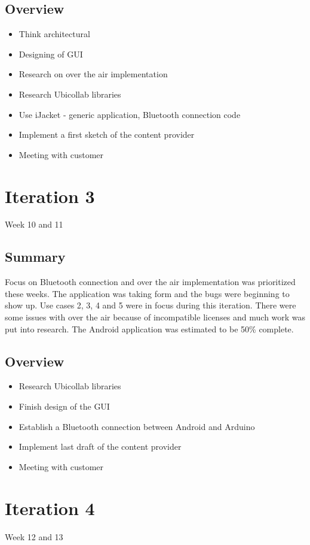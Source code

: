 \subsection{Overview}
\begin{itemize}
	\item{Think architectural}
	\item{Designing of GUI}
	\item{Research on over the air implementation}
	\item{Research Ubicollab libraries}
	\item{Use iJacket - generic application, Bluetooth connection code}
	\item{Implement a first sketch of the content provider}
	\item{Meeting with customer}
\end{itemize}

\section{Iteration 3}
Week 10 and 11
\subsection{Summary}
	Focus on Bluetooth connection and over the air implementation was prioritized these weeks. The application was taking form and the bugs were beginning to show up. Use cases 2, 3, 4 and 5 were in focus during this iteration. There were some issues with over the air because of incompatible licenses and much work was put into research. The Android application was estimated to be 50\% complete.

\subsection{Overview}
\begin{itemize}
	\item{Research Ubicollab libraries}
	\item{Finish design of the GUI}
	\item{Establish a Bluetooth connection between Android and Arduino}
	\item{Implement last draft of the content provider}
	\item{Meeting with customer}
\end{itemize}

\section{Iteration 4}\label{Iteration4}
Week 12 and 13
